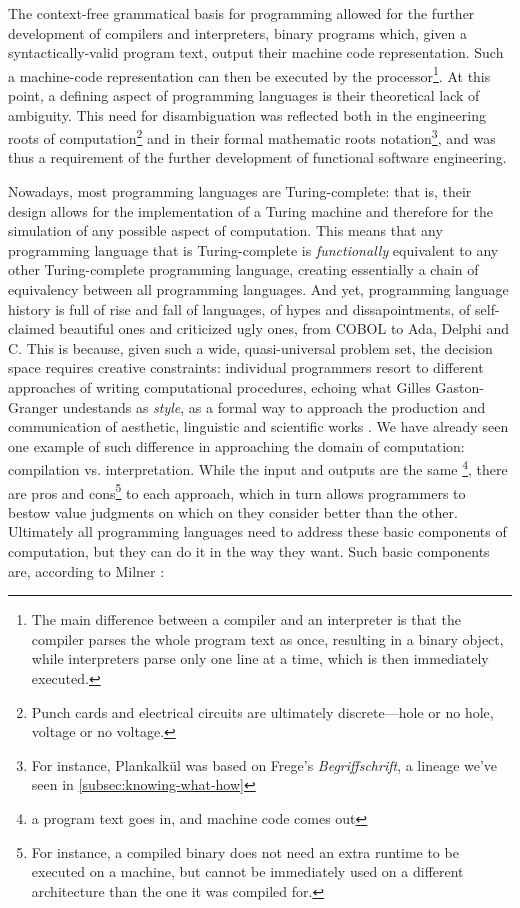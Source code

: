 The context-free grammatical basis for programming allowed for the further development of compilers and interpreters, binary programs which, given a syntactically-valid program text, output their machine code representation. Such a machine-code representation can then be executed by the processor\footnote{The main difference between a compiler and an interpreter is that the compiler parses the whole program text as once, resulting in a binary object, while interpreters parse only one line at a time, which is then immediately executed.}. At this point, a defining aspect of programming languages is their theoretical lack of ambiguity. This need for disambiguation was reflected both in the engineering roots of computation\footnote{Punch cards and electrical circuits are ultimately discrete—hole or no hole, voltage or no voltage.} and in their formal mathematic roots notation\footnote{For instance, Plankalkül was based on Frege's \emph{Begriffschrift}, a lineage we've seen in \autoref{subsec:knowing-what-how}}, and was thus a requirement of the further development of functional software engineering.

Nowadays, most programming languages are Turing-complete: that is, their design allows for the implementation of a Turing machine and therefore for the simulation of any possible aspect of computation. This means that any programming language that is Turing-complete is \emph{functionally} equivalent to any other Turing-complete programming language, creating essentially a chain of equivalency between all programming languages. And yet, programming language history is full of rise and fall of languages, of hypes and dissapointments, of self-claimed beautiful ones and criticized ugly ones, from COBOL to Ada, Delphi and C. This is because, given such a wide, quasi-universal problem set, the decision space requires creative constraints: individual programmers resort to different approaches of writing computational procedures, echoing what Gilles Gaston-Granger undestands as \emph{style}, as a formal way to approach the production and communication of aesthetic, linguistic and scientific works \citep{granger_essai_1988}. We have already seen one example of such difference in approaching the domain of computation: compilation vs. interpretation. While the input and outputs are the same \footnote{a program text goes in, and machine code comes out}, there are pros and cons\footnote{For instance, a compiled binary does not need an extra runtime to be executed on a machine, but cannot be immediately used on a different architecture than the one it was compiled for.} to each approach, which in turn allows programmers to bestow value judgments on which on they consider better than the other. Ultimately all programming languages need to address these basic components of computation, but they can do it in the way they want. Such basic components are, according to Milner \citep{milner_semantic_1996}:

